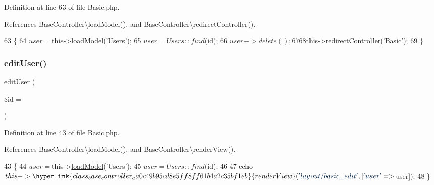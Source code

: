 Definition at line 63 of file Basic.\+php.



References Base\+Controller\textbackslash{}load\+Model(), and Base\+Controller\textbackslash{}redirect\+Controller().


\begin{DoxyCode}
63                                          \{
64         $user = $this->\hyperlink{class_base_controller_a5fa8890bd3a9d20f5c0cc2377dc49eb1}{loadModel}(\textcolor{stringliteral}{'Users'});
65         $user = Users::find($id);
66         $user->delete();
67 
68         $this->\hyperlink{class_base_controller_a85ddb683efc64655be063b697f631beb}{redirectController}(\textcolor{stringliteral}{'Basic'});
69     \}
\end{DoxyCode}
\hypertarget{class_basic_acd3b430aeceba0ebbda62330838d0c0b}{}\label{class_basic_acd3b430aeceba0ebbda62330838d0c0b} 
\subsubsection{\texorpdfstring{edit\+User()}{editUser()}}
{\footnotesize\ttfamily edit\+User (\begin{DoxyParamCaption}\item[{}]{\$id = {\ttfamily \textquotesingle{}\textquotesingle{}} }\end{DoxyParamCaption})}



Definition at line 43 of file Basic.\+php.



References Base\+Controller\textbackslash{}load\+Model(), and Base\+Controller\textbackslash{}render\+View().


\begin{DoxyCode}
43                                        \{
44         $user = $this->\hyperlink{class_base_controller_a5fa8890bd3a9d20f5c0cc2377dc49eb1}{loadModel}(\textcolor{stringliteral}{'Users'});
45         $user = Users::find($id);
46 
47         echo $this->\hyperlink{class_base_controller_aa0c49b95cd8e5ff8ff61b4a2c35bf1eb}{renderView}(\textcolor{stringliteral}{'layout/basic\_edit'}, [\textcolor{stringliteral}{'user'} => $user]);
48     \}
\end{DoxyCode}
\hypertarget{class_basic_a445a1f2f42c756bf451de087e36b7193}{}\label{class_basic_a445a1f2f42c756bf451de087e36b7193} 
